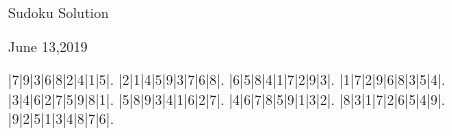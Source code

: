 \documentclass{article}
\begin{document}
\begin{center}
\Huge{Sudoku Solution}
\end{center}
\begin{center}
\Large{June 13,2019}
\end{center}
\begin{sudoku}
|7|9|3|6|8|2|4|1|5|.
|2|1|4|5|9|3|7|6|8|.
|6|5|8|4|1|7|2|9|3|.
|1|7|2|9|6|8|3|5|4|.
|3|4|6|2|7|5|9|8|1|.
|5|8|9|3|4|1|6|2|7|.
|4|6|7|8|5|9|1|3|2|.
|8|3|1|7|2|6|5|4|9|.
|9|2|5|1|3|4|8|7|6|.
\end{sudoku}
\end{document}
